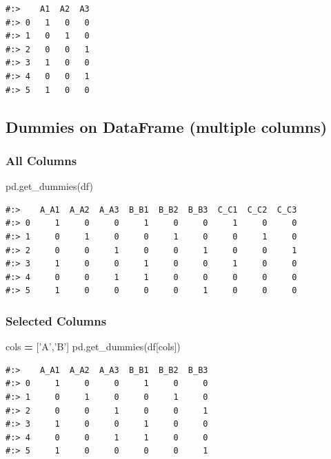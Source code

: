 \documentclass[
]{book}
\newenvironment{Shaded}{\begin{snugshade}}{\end{snugshade}}
\newcommand{\NormalTok}[1]{#1}
\newcommand{\OperatorTok}[1]{\textcolor[rgb]{0.43,0.43,0.43}{\textbf{#1}}}
\newcommand{\StringTok}[1]{\textcolor[rgb]{0.5,0.5,0.5}{#1}}
\begin{document}
\begin{verbatim}
#:>    A1  A2  A3
#:> 0   1   0   0
#:> 1   0   1   0
#:> 2   0   0   1
#:> 3   1   0   0
#:> 4   0   0   1
#:> 5   1   0   0
\end{verbatim}

\hypertarget{dummies-on-dataframe-multiple-columns}{%
\subsection{Dummies on DataFrame (multiple columns)}\label{dummies-on-dataframe-multiple-columns}}

\hypertarget{all-columns}{%
\subsubsection{All Columns}\label{all-columns}}

\begin{Shaded}
\begin{Highlighting}[]
\NormalTok{pd.get_dummies(df)}
\end{Highlighting}
\end{Shaded}

\begin{verbatim}
#:>    A_A1  A_A2  A_A3  B_B1  B_B2  B_B3  C_C1  C_C2  C_C3
#:> 0     1     0     0     1     0     0     1     0     0
#:> 1     0     1     0     0     1     0     0     1     0
#:> 2     0     0     1     0     0     1     0     0     1
#:> 3     1     0     0     1     0     0     1     0     0
#:> 4     0     0     1     1     0     0     0     0     0
#:> 5     1     0     0     0     0     1     0     0     0
\end{verbatim}

\hypertarget{selected-columns}{%
\subsubsection{Selected Columns}\label{selected-columns}}

\begin{Shaded}
\begin{Highlighting}[]
\NormalTok{cols }\OperatorTok{=}\NormalTok{ [}\StringTok{'A'}\NormalTok{,}\StringTok{'B'}\NormalTok{]}
\NormalTok{pd.get_dummies(df[cols])}
\end{Highlighting}
\end{Shaded}

\begin{verbatim}
#:>    A_A1  A_A2  A_A3  B_B1  B_B2  B_B3
#:> 0     1     0     0     1     0     0
#:> 1     0     1     0     0     1     0
#:> 2     0     0     1     0     0     1
#:> 3     1     0     0     1     0     0
#:> 4     0     0     1     1     0     0
#:> 5     1     0     0     0     0     1
\end{verbatim}
\end{document}
